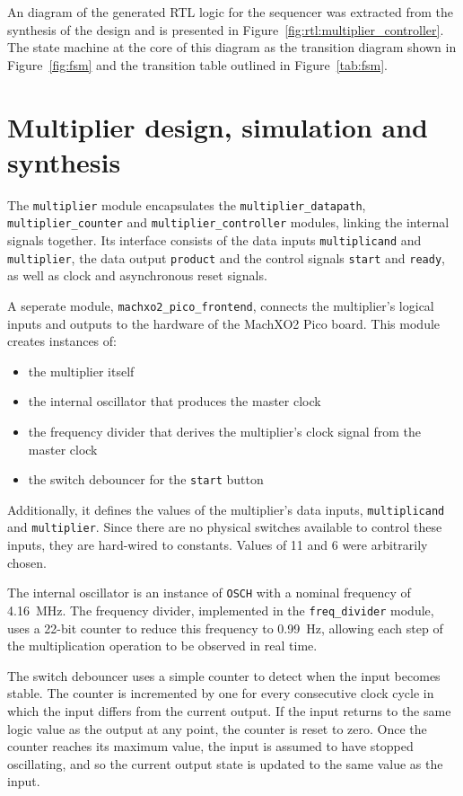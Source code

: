 \documentclass[a4paper]{article}
\begin{document}
An diagram of the generated RTL logic for the sequencer was extracted from the synthesis of the design and is presented in Figure~\ref{fig:rtl:multiplier_controller}. The state machine at the core of this diagram as the transition diagram shown in Figure~\ref{fig:fsm} and the transition table outlined in Figure~\ref{tab:fsm}.

\section{Multiplier design, simulation and synthesis}
\label{sec:mult}

The \texttt{multiplier} module encapsulates the \texttt{multiplier\_datapath}, \texttt{multiplier\_counter} and \texttt{multiplier\_controller} modules, linking the internal signals together. Its interface consists of the data inputs \texttt{multiplicand} and \texttt{multiplier}, the data output \texttt{product} and the control signals \texttt{start} and \texttt{ready}, as well as clock and asynchronous reset signals.

A seperate module, \texttt{machxo2\_pico\_frontend}, connects the multiplier's logical inputs and outputs to the hardware of the MachXO2 Pico board. This module creates instances of:
\begin{itemize}
  \item the multiplier itself
  \item the internal oscillator that produces the master clock
  \item the frequency divider that derives the multiplier's clock signal from the master clock
  \item the switch debouncer for the \texttt{start} button
\end{itemize}
Additionally, it defines the values of the multiplier's data inputs, \texttt{multiplicand} and \texttt{multiplier}. Since there are no physical switches available to control these inputs, they are hard-wired to constants. Values of 11 and 6 were arbitrarily chosen.

The internal oscillator is an instance of \texttt{OSCH} with a nominal frequency of \SI{4.16}{\mega\hertz}. The frequency divider, implemented in the \texttt{freq\_divider} module, uses a 22-bit counter to reduce this frequency to \SI{0.99}{\hertz}, allowing each step of the multiplication operation to be observed in real time.

The switch debouncer uses a simple counter to detect when the input becomes stable. The counter is incremented by one for every consecutive clock cycle in which the input differs from the current output. If the input returns to the same logic value as the output at any point, the counter is reset to zero. Once the counter reaches its maximum value, the input is assumed to have stopped oscillating, and so the current output state is updated to the same value as the input.
\end{document}
